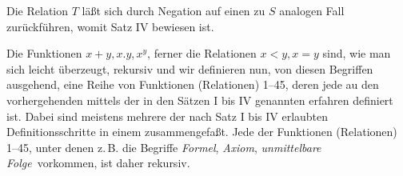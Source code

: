 \documentclass[draft]{scrartcl}
\begin{document}
Die Relation $T$ läßt sich durch Negation auf einen zu
$S$ analogen Fall zurückführen, womit Satz IV bewiesen
ist.

Die Funktionen $x + y, x.y, x^y$, ferner die Relationen
$x < y, x = y$ sind, wie man sich leicht überzeugt,
rekursiv und wir definieren nun, von diesen Begriffen
ausgehend, eine Reihe von Funktionen (Relationen) 1--45,
deren jede au den vorhergehenden mittels der in den Sätzen
I bis IV genannten erfahren definiert ist. Dabei sind
meistens mehrere der nach Satz I bis IV erlaubten
Definitionsschritte in einem zusammengefaßt. Jede der
Funktionen (Relationen) 1--45, unter denen z.\,B. die
Begriffe \glqq\textit{Formel}\grqq, \glqq\textit{Axiom}\grqq, \glqq\textit{unmittelbare Folge}\grqq\ vorkommen,
ist daher rekursiv.
\end{document}
